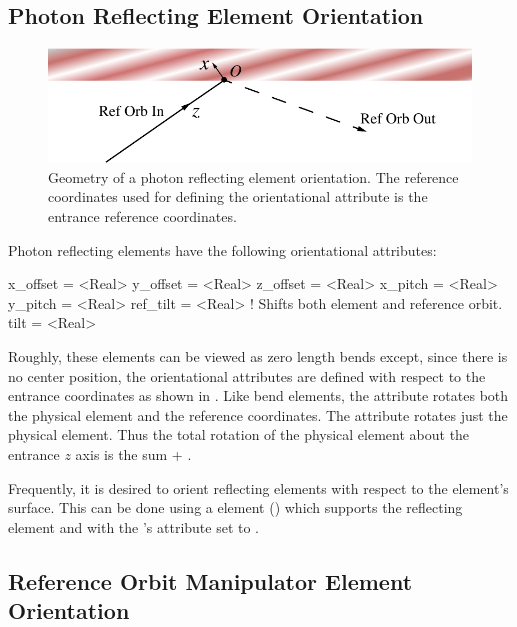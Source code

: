 \subsection{Photon Reflecting Element Orientation}
\label{s:photon.orient}

\begin{figure}[ht]
  \centering
  \includegraphics{reflect-orient.pdf}
  \caption[Geometry of a photon reflecting element orientation]{
Geometry of a photon reflecting element orientation.
The reference coordinates used for defining the orientational attribute
is the entrance reference coordinates. 
}
  \label{f:reflect.orient}
\end{figure}

Photon reflecting elements have the following orientational attributes:
\begin{example}
  x_offset = <Real>
  y_offset = <Real>
  z_offset = <Real>
  x_pitch  = <Real>
  y_pitch  = <Real>
  ref_tilt = <Real>    ! Shifts both element and reference orbit.
  tilt     = <Real>    
\end{example}
Roughly, these elements can be viewed as zero length bends except,
since there is no center position, the orientational attributes are
defined with respect to the entrance coordinates as shown in
. Like bend elements, the  attribute
rotates both the physical element and the reference coordinates.
The  attribute rotates just the physical element. Thus
the total rotation of the physical element about the entrance $z$
axis is the sum  + .

Frequently, it is desired to orient reflecting elements with respect
to the element's surface. This can be done using a  element
() which supports the reflecting element and with the
's  attribute set to .

\subsection{Reference Orbit Manipulator Element Orientation}
\label{s:manip.orient}

